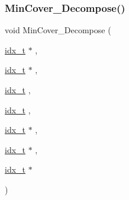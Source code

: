 \subsubsection{\texorpdfstring{Min\+Cover\+\_\+\+Decompose()}{MinCover\_Decompose()}}
{\footnotesize\ttfamily void Min\+Cover\+\_\+\+Decompose (\begin{DoxyParamCaption}\item[{\hyperlink{a00876_aaa5262be3e700770163401acb0150f52}{idx\+\_\+t} $\ast$}]{,  }\item[{\hyperlink{a00876_aaa5262be3e700770163401acb0150f52}{idx\+\_\+t} $\ast$}]{,  }\item[{\hyperlink{a00876_aaa5262be3e700770163401acb0150f52}{idx\+\_\+t}}]{,  }\item[{\hyperlink{a00876_aaa5262be3e700770163401acb0150f52}{idx\+\_\+t}}]{,  }\item[{\hyperlink{a00876_aaa5262be3e700770163401acb0150f52}{idx\+\_\+t} $\ast$}]{,  }\item[{\hyperlink{a00876_aaa5262be3e700770163401acb0150f52}{idx\+\_\+t} $\ast$}]{,  }\item[{\hyperlink{a00876_aaa5262be3e700770163401acb0150f52}{idx\+\_\+t} $\ast$}]{ }\end{DoxyParamCaption})}


